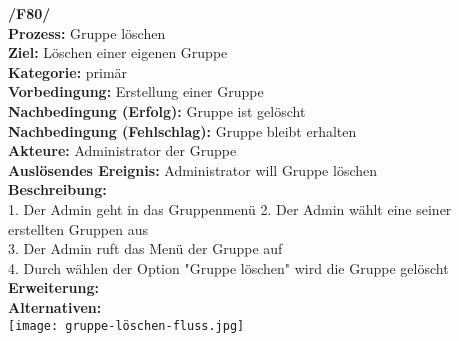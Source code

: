 \documentclass{article}
\begin{document}
\textbf{/F80/} \\
\textbf{Prozess:} Gruppe löschen \\
\textbf{Ziel:} Löschen einer eigenen Gruppe \\
\textbf{Kategorie:} primär \\
\textbf{Vorbedingung:} Erstellung einer Gruppe \\
\textbf{Nachbedingung (Erfolg):} Gruppe ist gelöscht\\
\textbf{Nachbedingung (Fehlschlag):} Gruppe bleibt erhalten\\
\textbf{Akteure:} Administrator der Gruppe \\
\textbf{Auslösendes Ereignis:} Administrator will Gruppe löschen\\
\textbf{Beschreibung:} \\
1. Der Admin geht in das Gruppenmenü
2. Der Admin wählt eine seiner erstellten Gruppen aus \\
3. Der Admin ruft das Menü der Gruppe auf \\
4. Durch wählen der Option "Gruppe löschen" wird die Gruppe gelöscht \\
\textbf{Erweiterung:} \\
\textbf{Alternativen:} \\

\texttt{[image: gruppe-löschen-fluss.jpg]}
\end{document}
